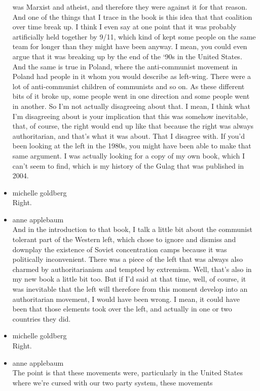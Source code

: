 \begin{itemize}
  was Marxist and atheist, and therefore they were against it for that
  reason. And one of the things that I trace in the book is this idea
  that that coalition over time break up. I think I even say at one
  point that it was probably artificially held together by 9/11, which
  kind of kept some people on the same team for longer than they might
  have been anyway. I mean, you could even argue that it was breaking up
  by the end of the `90s in the United States. And the same is true in
  Poland, where the anti-communist movement in Poland had people in it
  whom you would describe as left-wing. There were a lot of
  anti-communist children of communists and so on. As these different
  bits of it broke up, some people went in one direction and some people
  went in another. So I'm not actually disagreeing about that. I mean, I
  think what I'm disagreeing about is your implication that this was
  somehow inevitable, that, of course, the right would end up like that
  because the right was always authoritarian, and that's what it was
  about. That I disagree with. If you'd been looking at the left in the
  1980s, you might have been able to make that same argument. I was
  actually looking for a copy of my own book, which I can't seem to
  find, which is my history of the Gulag that was published in 2004.
\item
  michelle goldberg\\
  Right.
\item
  anne applebaum\\
  And in the introduction to that book, I talk a little bit about the
  communist tolerant part of the Western left, which chose to ignore and
  dismiss and downplay the existence of Soviet concentration camps
  because it was politically inconvenient. There was a piece of the left
  that was always also charmed by authoritarianism and tempted by
  extremism. Well, that's also in my new book a little bit too. But if
  I'd said at that time, well, of course, it was inevitable that the
  left will therefore from this moment develop into an authoritarian
  movement, I would have been wrong. I mean, it could have been that
  those elements took over the left, and actually in one or two
  countries they did.
\item
  michelle goldberg\\
  Right.
\item
  anne applebaum\\
  The point is that these movements were, particularly in the United
  States where we're cursed with our two party system, these movements

\end{itemize}

